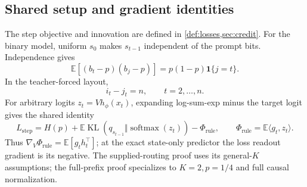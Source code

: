 \providecommand{\LRstep}{L_{\mathrm{step}}}
\providecommand{\LRout}{L_{\mathrm{out}}}
\providecommand{\LRsig}{\sigma}
\providecommand{\LRnorm}[1]{\left\lVert #1\right\rVert}
\providecommand{\LRinner}[2]{\left\langle #1,#2\right\rangle}
\theoremstyle{plain}
\newtheorem{lrlemma}[lemma]{Lemma}
\newtheorem{lrproposition}[proposition]{Proposition}
\newtheorem{lrtheorem}[theorem]{Theorem}
\newtheorem{lrremark}[remark]{Remark}

\subsection{Shared setup and gradient identities}
\label{app:weak-routing-initial}

The step objective and innovation are defined in \cref{def:losses,sec:credit}.
For the binary model, uniform $s_0$ makes $s_{t-1}$ independent
of the prompt bits. Independence gives
\begin{equation}\label{eq:lr-innovation-cov}
 \mathbb E[(b_t-p)(b_j-p)]=p(1-p)\mathbf1\{j=t\}.
\end{equation}
In the teacher-forced layout,
\begin{equation}\label{eq:lr-constant-lag}
 i_t-j_t=n,\qquad t=2,\ldots,n.
\end{equation}
For arbitrary logits $z_t=Vh_\phi(x_t)$, expanding log-sum-exp minus the target
logit gives the shared identity
\begin{equation}\label{eq:lr-kl-decomp}
 L_{\mathrm{step}}=H(p)+\mathbb E\operatorname{KL}
 (q_{s_{t-1}}\Vert\operatorname{softmax}(z_t))-\Phi_{\mathrm{rule}},\qquad
 \Phi_{\mathrm{rule}}=\mathbb E\langle g_t,z_t\rangle.
\end{equation}
Thus $\nabla_V\Phi_{\mathrm{rule}}=\mathbb E[g_th_t^\top]$; at the exact
state-only predictor the loss readout gradient is its negative.
The supplied-routing proof uses its general-$K$ assumptions; the full-prefix
proof specializes to $K=2,p=1/4$ and full causal normalization.
